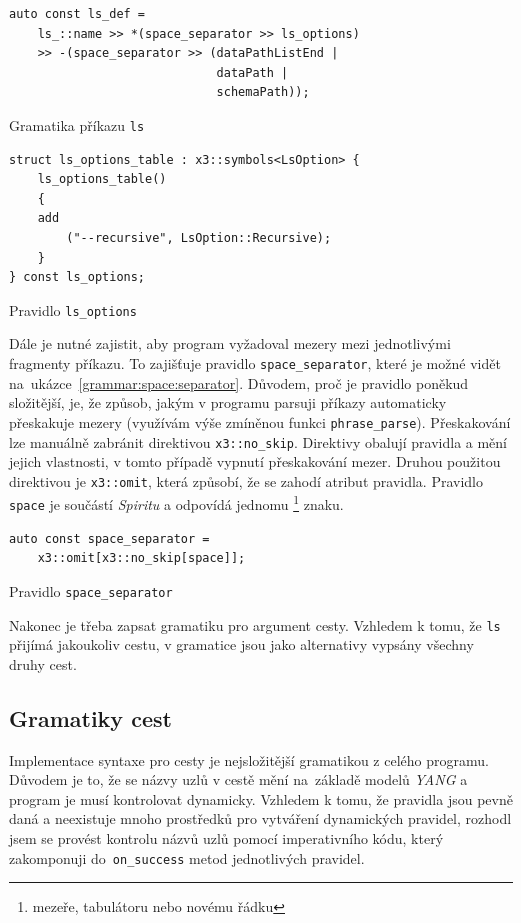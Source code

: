 \documentclass[thesis=B,czech,hidelinks]{FITthesis}[2019/03/06]
\begin{document}
\begin{listing}
\begin{verbatim}
auto const ls_def =
    ls_::name >> *(space_separator >> ls_options)
    >> -(space_separator >> (dataPathListEnd |
                             dataPath |
                             schemaPath));
\end{verbatim}
\caption{Gramatika příkazu \texttt{ls}}\label{grammar:ls}
\end{listing}


\begin{listing}
\begin{verbatim}
struct ls_options_table : x3::symbols<LsOption> {
    ls_options_table()
    {
    add
        ("--recursive", LsOption::Recursive);
    }
} const ls_options;
\end{verbatim}
\caption{Pravidlo \texttt{ls\_options}}\label{grammar:ls:options}
\end{listing}

Dále je nutné zajistit, aby program vyžadoval mezery mezi jednotlivými fragmenty příkazu. To zajišťuje pravidlo \verb¨space_separator¨, které je možné vidět na~ukázce~\ref{grammar:space:separator}. Důvodem, proč je pravidlo poněkud složitější, je, že způsob, jakým v programu parsuji příkazy automaticky přeskakuje mezery (využívám výše zmíněnou funkci \texttt{phrase\_parse}). Přeskakování lze manuálně zabránit direktivou \verb¨x3::no_skip¨. Direktivy obalují pravidla a mění jejich vlastnosti, v tomto případě vypnutí přeskakování mezer. Druhou použitou direktivou je \verb¨x3::omit¨, která způsobí, že se zahodí atribut pravidla. Pravidlo \texttt{space} je součástí \textit{Spiritu} a odpovídá jednomu \footnote{mezeře, tabulátoru nebo novému řádku} znaku.

\begin{listing}
\begin{verbatim}
auto const space_separator =
    x3::omit[x3::no_skip[space]];
\end{verbatim}
\caption{Pravidlo \texttt{space\_separator}}\label{grammar:space:separator}
\end{listing}

Nakonec je třeba zapsat gramatiku pro argument cesty. Vzhledem k tomu, že \texttt{ls} přijímá jakoukoliv cestu, v gramatice jsou jako alternativy vypsány všechny druhy cest.

\subsection{Gramatiky cest}
Implementace syntaxe pro cesty je nejsložitější gramatikou z celého programu. Důvodem je to, že se názvy uzlů v cestě mění na~základě modelů \textit{YANG} a program je musí kontrolovat dynamicky. Vzhledem k tomu, že pravidla jsou pevně daná a neexistuje mnoho prostředků pro vytváření dynamických pravidel, rozhodl jsem se provést kontrolu názvů uzlů pomocí imperativního kódu, který zakomponuji do~\verb¨on_success¨ metod jednotlivých pravidel.
\end{document}
